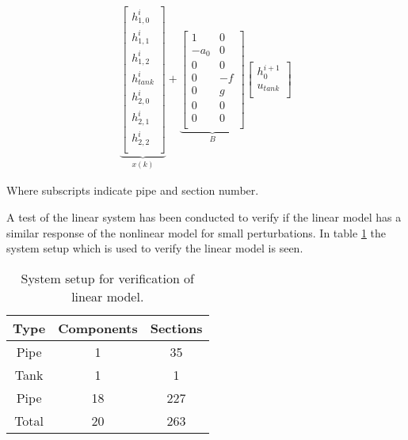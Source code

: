 \begin{equation}
\begin{aligned}
            \underbrace{\begin{bmatrix}
        h_{1,0}^{i} \\
        h_{1,1}^{i} \\
        h_{1,2}^{i} \\
        h_{tank}^{i}\\
        h_{2,0}^{i}\\
        h_{2,1}^{i}\\
          h_{2,2}^{i}\\
        \end{bmatrix}}_{x(k)}
    +  \underbrace{\begin{bmatrix}
         1 & 0\\
         -a_0& 0 \\
         0 & 0\\
          0& -f \\
          0& g \\ 
          0& 0 \\
          0& 0 \\
        \end{bmatrix}}_{B}
        \begin{bmatrix}
        h_0^{i+1}\\
        u_{tank} \\
        \end{bmatrix}
    \end{aligned}
\end{equation}

Where subscripts indicate pipe and section number.

A test of the linear system has been conducted to verify if the linear model has a similar response of the nonlinear model for small perturbations. %
In table \ref{tab:system_setup_nonlinear_linear_test} the system setup which is used to verify the linear model is seen.

\begin{table}[H]
\centering
\begin{tabular}{|c|c|c|}
\hline
	\rowcolor[HTML]{9B9B9B} 
Type  & Components & Sections \\ \hline
Pipe  & 1         & 35       \\ \hline
Tank  & 1         & 1        \\ \hline
Pipe  & 18        & 227      \\ \hline
Total & 20        & 263      \\ \hline
\end{tabular}
\caption{System setup for verification of linear model.}
\label{tab:system_setup_nonlinear_linear_test}
\end{table}

